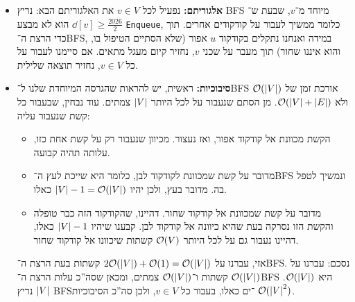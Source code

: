 \documentclass[]{../../../../tex/classes/homework}
\begin{document}
	\npage
	\section{}
	\begin{itemize}
		\item \textbf{אלגוריתם: }נפעיל לכל $v \in V$ את האלגוריתם הבא: נריץ BFS מיוחד מ־$v$, שבעת ש־$\dd[v] \ge \frac{2026}{2}$ הוא לא מבצע \texttt{Enqueue}, כלומר ממשיך לעבור על קודקודים אחרים. תוך כדי הרצת ה־BFS, במידה ואנחנו נתקלים בקודקוד $u$ אפור (שלא הסתיים הטיפול בו, והוא איננו שחור) תוך מעבר על שכני $v$, נחזיר קיום מעגל מתאים. אם סיימנו לעבור על כל $v \in V$, נחזיר תוצאה שלילית. 
		
		\item \textbf{סיבוכיות: }ראשית, יש להראות שהגרסה המיוחדת שלנו ל־BFS אורכת זמן של $\mathcal{O}(\left \lvert V \right \rvert)$ ולא $\mathcal{O}(\left \lvert V \right \rvert + \left \lvert E \right \rvert)$. מן הסתם שנעבור על לכל היותר $\left \lvert V \right \rvert$ צמתים. עוד נבחין, שבעבור כל קשת שנעבור עליה: 
		\begin{itemize}
			\item הקשת מכוונת אל קודקוד אפור, ואז נעצור. מכיוון שנעבור רק על קשת אחת כזו, עלותה תהיה קבועה. 
			\item מדובר על קשת שמכוונת לקודקוד לבן, כלומר היא שייכת לעץ ה־BFS ונמשיך לטפל בה. מדובר בעץ, ולכן יהיו $\left \lvert V \right \rvert - 1 = \mathcal{O}(\left \lvert V \right \rvert)$ כאלו. 
			\item מדובר על קשת שמכוונת אל קודקוד שחור. דהיינו, שהקודקוד הזה כבר טופלה והקשת הזו נסרקה בעת שהיא כיוונה אל קודקוד לבן. קבענו שיהיו $\left \lvert V \right \rvert - 1$ כאלו, דהיינו נעבור גם על לכל היותר $\mathcal{O}(V)$ קשתות שיכוונו אל קודקוד שחור. 
		\end{itemize}
		אזי, עברנו על $2 \mathcal{O}(\left \lvert V \right \rvert) + \mathcal{O}(1) = \mathcal{O}(\left \lvert V \right \rvert)$ קשתות בעת הרצת ה־BFS. נסכם: עברנו על $\mathcal{O}(\left \lvert V \right \rvert)$ קשתות ו־$\mathcal{O}(\left \lvert V \right \rvert)$ צמתים, ומכאן שסה''כ עלות הרצת ה־BFS היא $\mathcal{O}(\left \lvert V \right \rvert)$. נריץ $\left \lvert V \right \rvert$ BFS־ים כאלו, בעבור כל $v \in V$, ולכן סה''כ הסיבוכיות $\mathcal{O}(\left \lvert V \right \rvert^2)$. 
		

\end{itemize}
\end{document}
